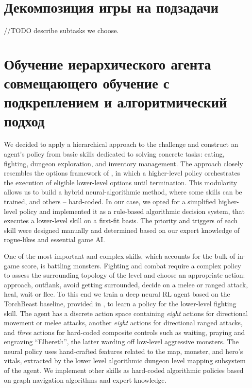 \section{Декомпозиция игры на подзадачи}

//TODO describe subtasks we choose. 


\section{Обучение иерархического агента совмещающего обучение с подкреплением и алгоритмический подход}


We decided to apply a hierarchical approach to the challenge and construct an agent's policy from basic skills dedicated to solving concrete tasks: eating, fighting, dungeon exploration, and inventory management. The approach closely resembles the options framework of \cite{Sutton1999}, in which a higher-level policy orchestrates the execution of eligible lower-level options until termination. This modularity allows us to build a hybrid neural-algorithmic method, where some skills can be trained, and others -- hard-coded.
%
In our case, we opted for a simplified higher-level policy and implemented it as a rule-based algorithmic decision system, that executes a lower-level skill on a first-fit basis. The priority and triggers of each skill were designed manually and determined based on our expert knowledge of rogue-likes and essential game AI.

One of the most important and complex skills, which accounts for the bulk of in-game score, is battling monsters. Fighting and combat require a complex policy to assess the surrounding topology of the level and choose an appropriate action: approach, outflank, avoid getting surrounded, decide on a melee or ranged attack, heal, wait or flee.
%
To this end we train a deep neural RL agent based on the TorchBeast baseline, provided in \cite{kuettler2020nethack}, to learn a policy for the lower-level fighting skill. The agent has a discrete action space containing \emph{eight} actions for directional movement or melee attacks, another \emph{eight} actions for directional ranged attacks, and \emph{three} actions for hard-coded composite controls such as waiting, praying and engraving ``Elbereth'', the latter warding off low-level aggressive monsters.
%
The neural policy uses hand-crafted features related to the map, monster, and hero's vitals, extracted by the lower level algorithmic dungeon level mapping subsystem of the agent.
%
We implement other skills as hard-coded algorithmic policies based on graph navigation algorithms and expert knowledge.

